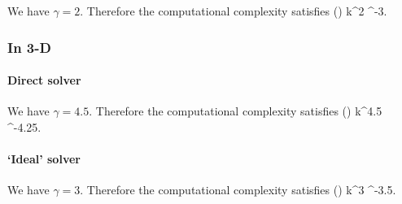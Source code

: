 We have $\gamma = 2$. Therefore  the computational complexity satisfies
\beqs
\CMC(\eps) \lesssim k^2 \eps^{-3}.
\eeqs

\subsubsection{In 3-D}

\paragraph{Direct solver}

We have $\gamma = 4.5$. Therefore  the computational complexity satisfies
\beqs
\CMC(\eps) \lesssim k^{4.5} \eps^{-4.25}.
\eeqs

\paragraph{`Ideal' solver}

We have $\gamma = 3$. Therefore  the computational complexity satisfies
\beqs
\CMC(\eps) \lesssim k^3 \eps^{-3.5}.
\eeqs